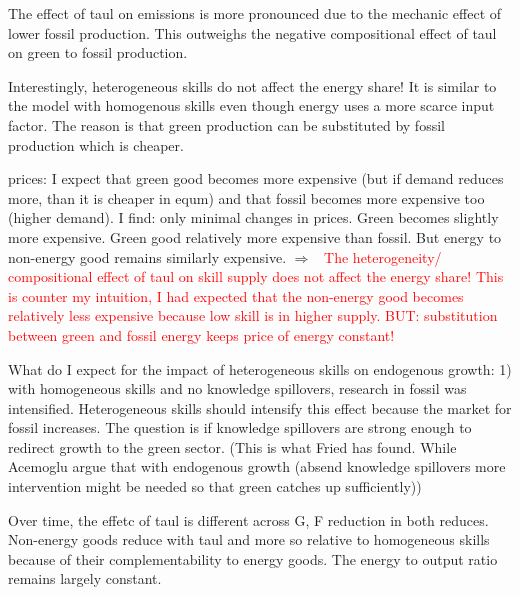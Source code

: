 \documentclass[12pt]{article}
\newcommand{\ar}{$\Rightarrow$ \ }
\newcommand{\tr}[1]{\textcolor{red}{#1}}
\begin{document}
The effect of taul on emissions is more pronounced due to the mechanic effect of lower fossil production. This outweighs the negative compositional effect of taul on green to fossil production. 

Interestingly, heterogeneous skills do not affect the energy share! It is similar to the model with homogenous skills even though energy uses a more scarce input factor. The reason is that green production can be substituted by fossil production which is cheaper. 

prices: I expect that green good becomes more expensive (but if demand reduces more, than it is cheaper in equm) and that fossil becomes more expensive too (higher demand). I find: only minimal changes in prices. Green becomes slightly more expensive. Green good relatively more expensive than fossil. But energy to non-energy good remains similarly expensive. 
\ar \tr{The heterogeneity/ compositional effect of taul on skill supply does not affect the energy share! This is counter my intuition, I had expected that the non-energy good becomes relatively less expensive because low skill is in higher supply. BUT: substitution between green and fossil energy keeps price of energy constant!
}

What do I expect for the impact of heterogeneous skills on endogenous growth: 1) with homogeneous skills and no knowledge spillovers, research in fossil was intensified. Heterogeneous skills should intensify this effect because the market for fossil increases. 
The question is if knowledge spillovers are strong enough to redirect growth to the green sector. (This is what Fried has found. While Acemoglu argue that with endogenous growth (absend knowledge spillovers more intervention might be needed so that green catches up sufficiently))


Over time, the effetc of taul is different across G, F reduction in both reduces. 
Non-energy goods reduce with taul and more so relative to homogeneous skills because of their complementability to energy goods. The energy to output ratio remains largely constant.
\end{document}

